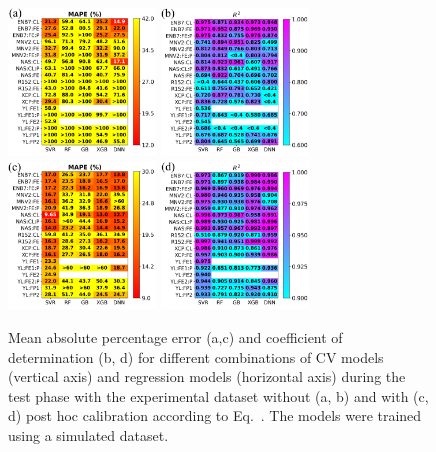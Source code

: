 \documentclass[10pt]{iopart}
\begin{document}
\begin{figure}
\centering
\includegraphics[width=0.35\textwidth]{Fig7a}
\includegraphics[width=0.35\textwidth]{Fig7b}
\includegraphics[width=0.35\textwidth]{Fig7c}
\includegraphics[width=0.35\textwidth]{Fig7d}
\caption{
Mean absolute percentage error (a,c) and coefficient of determination (b, d) for different combinations of CV models (vertical axis)
and regression models (horizontal axis) during the test phase with the experimental dataset without (a, b) and with (c, d)
post hoc calibration according to Eq.~.
The models were trained using a simulated dataset.
}\label{Fig7}
\end{figure}
\end{document}
